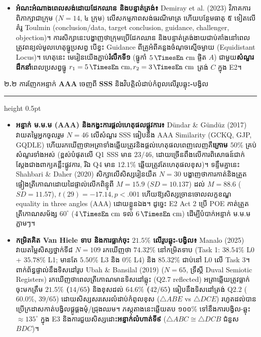 \documentclass[a4paper,12pt]{article}
\newcommand{\en}[1]{{\TimesEn #1}}
\newcommand{\enbf}[1]{{\TimesEn\textbf{#1}}}
\newcommand{\unit}[1]{\,\text{\en{#1}}}
\newcommand{\tri}[1]{\ensuremath{\triangle #1}}
\newcommand{\cg}{\ensuremath{\cong}}
\newcommand{\subsectitle}[1]{{\muol\fontsize{11pt}{14.5pt}\selectfont #1}}
\newcommand{\subsec}[1]{%
  \needspace{1.6cm}%
  \vspace{4pt}%
  \subsectitle{#1}\par
  \vspace{2pt}\hrule height 0.5pt\vspace{3pt}%
}
\begin{document}
\begin{itemize}[leftmargin=0.50cm, topsep=2pt, itemsep=2.5pt, parsep=0pt]
  \item \textbf{អំណះអំណាងពេលសង់ដោយដែកឈាន និងបន្ទាត់ត្រង់៖} \en{Demiray et al. (2023)} វិភាគការពិភាក្សាជាក្រុម ($N=14$, ៤ ក្រុម) លើសកម្មភាពសង់ធរណីមាត្រ ហើយបន្ថែមធាតុ ៥ ទៀតលើគំរូ \en{Toulmin} (\en{conclusion/data, target conclusion, guidance, challenger, objection})។ ការសិក្សានេះបង្ហាញថាក្រុមប្រើដែកឈាន និងបន្ទាត់ត្រង់ងាយជាប់គាំងនៅពេលត្រូវពន្យល់មូលហេតុធ្នូប្រសព្វ បើខ្វះ \en{Guidance} ពីគ្រូអំពីគន្លងចំណុចស្មើចម្ងាយ (\en{Equidistant Locus})។ ហេតុនេះ មេរៀនយើងភ្ជាប់\textbf{រំលឹកទី១} (ធ្នូកាំ $5\unit{cm}$ ផ្ចិត $A$) ជាមួយ\textbf{សំណួរដឹកនាំ}ពេលប្រសព្វធ្នូ $r_1=5\unit{cm}, r_2=3\unit{cm}$ ត្រង់ $C$ ក្នុង \en{E2}។
\end{itemize}

\subsec{២\enbf{.}២ ការញែកអន្ទាក់ \enbf{AAA} ចេញពី \enbf{SSS} និងវិបត្តិលំដាប់កំពូលលើរូបឆ្លុះ\enbf{-}បង្វិល}

\begin{itemize}[leftmargin=0.50cm, topsep=2pt, itemsep=2.5pt, parsep=0pt]
  \item \textbf{អន្ទាក់ ម.ម.ម (\en{AAA}) និងកង្វះការផ្ដល់ហេតុផលផ្លូវការ៖} \en{Dündar \& Gündüz (2017)} វាយតម្លៃអ្នកចូលរួម $N=46$ លើសំណួរ \en{SSS} ធៀបនឹង \en{AAA Similarity} (\en{GCKQ, GJP, GQDLE}) ហើយរកឃើញថាអត្រាទាំងឆ្លើយត្រូវនិងផ្ដល់ហេតុផលពេញលេញគឺ\textbf{ក្រោម $50\%$} គ្រប់សំណួរទាំងអស់ (ខ្ពស់បំផុតលើ \en{Q1 SSS} មាន $23/46$, ដោយច្រើនពឹងលើការពិសោធន៍ជាក់ស្ដែងជាងពាក្យគន្លឹះផ្លូវការ, រីឯ \en{Q4} មាន $12.1\%$ ឆ្លើយត្រូវតែហេតុផលខុស)។ ទន្ទឹមគ្នានេះ \en{Shahbari \& Daher (2020)} សិក្សាលើសិស្សរៀនយឺត $N=30$ បង្ហាញថាការកាត់និងត្រួតផ្ទៀងត្រីកោណដោយដៃផ្ទាល់លើកពិន្ទុពី $M=15.9$ ($SD=10.137$) ដល់ $M=88.6$ ($SD=11.57$), $t(29)=-17.14, p<.001$ ហើយឱ្យសិស្សច្រានចោលលក្ខខណ្ឌ \en{equality in three angles (AAA)} ដោយខ្លួនឯង។ ដូច្នេះ \en{E2 Act 2} ប្រើ \en{POE} កាត់ត្រួតត្រីកោណសម័ង្ស $60^\circ$ ($4\unit{cm}$ ទល់ $6\unit{cm}$) ដើម្បីបំបាក់អន្ទាក់ ម.ម.ម ភ្លាមៗ។
  \item \textbf{កម្រិតគិត \en{Van Hiele} ទាប និងការធ្លាក់ចុះ $21.5\%$ លើរូបឆ្លុះ-បង្វិល៖} \en{Manalo (2025)} វាយតម្លៃសិស្សថ្នាក់ទី៨ $N=109$ រកឃើញថា $74.32\%$ នៅកម្រិតទាប (\en{Task 1}: $38.54\%$ \en{L0} + $35.78\%$ \en{L1}; មានតែ $5.50\%$ \en{L3} និង $0\%$ \en{L4}) និង $85.32\%$ ជាប់នៅ \en{L0} លើ \en{Task 3}។ ពាក់ព័ន្ធផ្ទាល់នឹងទិសដៅរូប \en{Ubah \& Bansilal (2019)} ($N=65$, ទ្រឹស្ដី \en{Duval Semiotic Registers}) រកឃើញថាពេលត្រីកោណមានទិសដៅឆ្លុះ (\en{Q2.7 reflected}) អត្រាឆ្លើយត្រូវធ្លាក់ចុះមកត្រឹម \textbf{$21.5\%$ ($14/65$)} និងខុសដល់ \textbf{$64.6\%$ ($42/65$)} ធៀបនឹងទិសដៅត្រង់ \en{Q2.2} ($60.0\%$, $39/65$) ដោយសិស្សសរសេរលំដាប់កំពូលខុស ($\tri{ABE}$ vs $\tri{DCE}$) រហូតដល់បានប្រើក្រដាសកាត់បង្វិលផ្គូផ្គងមុំ/ជ្រុងឈម។ ភស្តុតាងនេះឆ្លើយតប ១០០\% ទៅនឹងការបង្វិល-ឆ្លុះ $\approx 135^\circ$ ក្នុង \en{E3} និងការជួយសិស្សដោះ\textbf{អន្ទាក់លំហាត់ទី៩} ($\tri{ABC}\cg\tri{DCB}$ ជំនួស $BDC$)។
\end{itemize}
\end{document}
